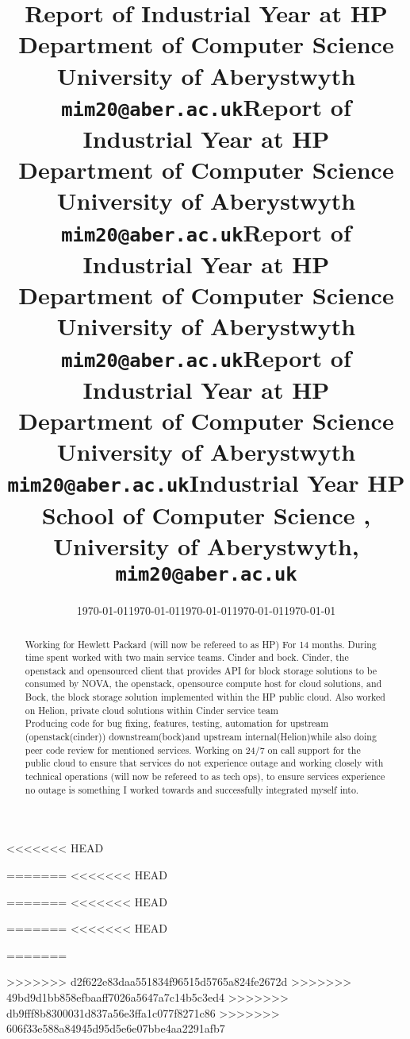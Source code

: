 \documentclass[11pt,a4paper]{report}
\begin{document}
<<<<<<< HEAD
\title{Report of Industrial Year at HP\\Department of Computer Science\\ University of Aberystwyth\\ \texttt{mim20@aber.ac.uk}} \date{\today}
=======
<<<<<<< HEAD
\title{Report of Industrial Year at HP\\Department of Computer Science\\ University of Aberystwyth\\ \texttt{mim20@aber.ac.uk}} \date{\today}
=======
<<<<<<< HEAD
\title{Report of Industrial Year at HP\\Department of Computer Science\\ University of Aberystwyth\\ \texttt{mim20@aber.ac.uk}} \date{\today}
=======
<<<<<<< HEAD
\title{Report of Industrial Year at HP\\Department of Computer Science\\ University of Aberystwyth\\ \texttt{mim20@aber.ac.uk}} \date{\today}
=======
\title{Industrial Year HP School of Computer Science ,\\ University of Aberystwyth,\\ \texttt{mim20@aber.ac.uk}} \date{\today}
>>>>>>> d2f622e83daa551834f96515d5765a824fe2672d
>>>>>>> 49bd9d1bb858efbaaff7026a5647a7c14b5c3ed4
>>>>>>> db9fff8b8300031d837a56e3ffa1c077f8271c86
>>>>>>> 606f33e588a84945d95d5e6e07bbe4aa2291afb7
\maketitle

\begin{abstract} 

Working for Hewlett Packard (will now be refereed to as HP) For 14 months. During time spent worked with two main service teams. Cinder and bock. Cinder, the openstack and opensourced client that provides API for block storage solutions to be consumed by NOVA, the openstack, opensource compute host for cloud solutions, and Bock, the block storage solution implemented within the HP public cloud. Also worked on Helion, private cloud solutions within Cinder service team\\ 
Producing code for bug fixing, features, testing, automation for upstream (openstack(cinder)) downstream(bock)and upstream internal(Helion)while also doing peer code review for mentioned services. 
Working on 24/7 on call support for the public cloud to ensure that services do not experience outage and working closely with technical operations (will now be refereed to as tech ops), to ensure services experience no outage is something I worked towards and successfully integrated myself into.

\end{abstract}
\end{document}
